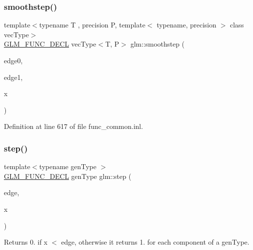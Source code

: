 \mbox{\label{group__core__func__common_ga8b9b9ba3425d603118cf90aee8b32bd6}} 
\subsubsection{\texorpdfstring{smoothstep()}{smoothstep()}\hspace{0.1cm}{\footnotesize\ttfamily [3/3]}}
{\footnotesize\ttfamily template$<$typename T , precision P, template$<$ typename, precision $>$ class vec\+Type$>$ \\
\mbox{\hyperlink{setup_8hpp_ab2d052de21a70539923e9bcbf6e83a51}{G\+L\+M\+\_\+\+F\+U\+N\+C\+\_\+\+D\+E\+CL}} vec\+Type$<$T, P$>$ glm\+::smoothstep (\begin{DoxyParamCaption}\item[{vec\+Type$<$ T, P $>$ const \&}]{edge0,  }\item[{vec\+Type$<$ T, P $>$ const \&}]{edge1,  }\item[{vec\+Type$<$ T, P $>$ const \&}]{x }\end{DoxyParamCaption})}



Definition at line 617 of file func\+\_\+common.\+inl.

\mbox{\label{group__core__func__common_ga015a1261ff23e12650211aa872863cce}} 
\subsubsection{\texorpdfstring{step()}{step()}\hspace{0.1cm}{\footnotesize\ttfamily [1/3]}}
{\footnotesize\ttfamily template$<$typename gen\+Type $>$ \\
\mbox{\hyperlink{setup_8hpp_ab2d052de21a70539923e9bcbf6e83a51}{G\+L\+M\+\_\+\+F\+U\+N\+C\+\_\+\+D\+E\+CL}} gen\+Type glm\+::step (\begin{DoxyParamCaption}\item[{gen\+Type}]{edge,  }\item[{gen\+Type}]{x }\end{DoxyParamCaption})}

Returns 0. if x $<$ edge, otherwise it returns 1. for each component of a gen\+Type.

